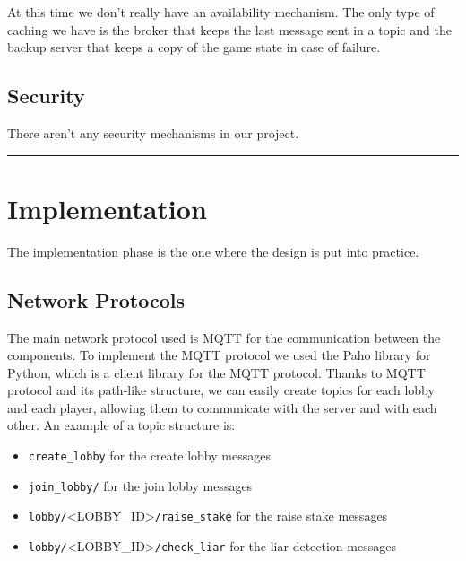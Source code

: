 \documentclass{scrartcl}
\begin{document}
At this time we don't really have an availability mechanism. \newline
The only type of caching we have is the broker that keeps the last message sent in a topic
and the backup server that keeps a copy of the game state in case of failure.

\subsection{Security}\label{security}

There aren't any security mechanisms in our project. \newline


\begin{center}\rule{0.5\linewidth}{0.5pt}\end{center}

\section{Implementation}\label{implementation}

The implementation phase is the one where the design is put into practice.
\subsection{Network Protocols}\label{network-protocols}
The main network protocol used is MQTT for the communication between the components. 
To implement the MQTT protocol we used the Paho library for Python, which is a client library for the MQTT protocol. \newline
Thanks to MQTT protocol and its path-like structure, we can easily create topics for each lobby and each player, allowing them to communicate with the server and with each other. \newline
An example of a topic structure is:
\begin{itemize}
  \item \texttt{create\_lobby} for the create lobby messages
  \item \texttt{join\_lobby/} for the join lobby messages
  \item \texttt{lobby/}\textless LOBBY\_ID\textgreater\texttt{/raise\_stake} for the raise stake messages
  \item \texttt{lobby/}\textless LOBBY\_ID\textgreater\texttt{/check\_liar} for the liar detection messages
\end{itemize}
\end{document}
